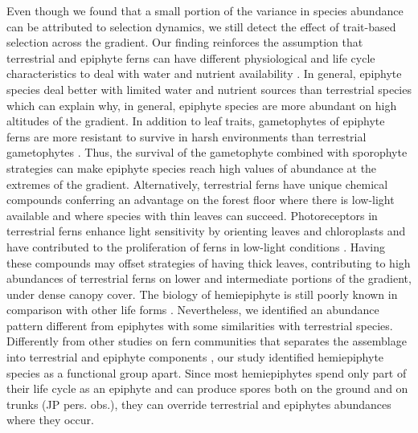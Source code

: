 \documentclass[12pt]{article}
\begin{document}
Even though we found that a small portion of the variance in species abundance can be attributed to selection dynamics, we still detect the effect of trait-based selection across the gradient.  
Our finding reinforces the assumption that terrestrial and epiphyte ferns can have different physiological and life cycle characteristics to deal with water and nutrient availability \citep{Page2002, Watkins2012}. In general, epiphyte species deal better with limited water and nutrient sources than terrestrial species \citep{Page2002, Schuettpelz2009, Watkins2012} which can explain why, in general, epiphyte species are more  abundant on high altitudes of the gradient. In addition to leaf traits, gametophytes of epiphyte ferns are more resistant to survive in harsh environments than terrestrial gametophytes \citep{Watkins2012}. Thus, the survival of the gametophyte combined with sporophyte strategies can make epiphyte species reach high values of abundance at the extremes of the gradient. Alternatively, terrestrial ferns have unique chemical compounds conferring an advantage on the forest floor where there is low-light available \citep{Kawai2003} and where species with thin leaves can succeed. Photoreceptors in terrestrial ferns enhance light sensitivity by orienting leaves and chloroplasts and have contributed to the proliferation of ferns in low-light conditions \citep{Kawai2003}. Having these compounds may offset strategies of having thick leaves, contributing to high abundances of terrestrial ferns on lower and intermediate portions of the gradient, under dense canopy
cover. The biology of hemiepiphyte is still poorly known in comparison with other life forms \citep{Watkins2012}. Nevertheless, we identified an abundance pattern different from epiphytes with some similarities with terrestrial species. Differently from other studies on fern communities that separates the assemblage into terrestrial and epiphyte components \citep{WatkinsJr2006, Kluge2010}, our study identified hemiepiphyte species as a functional group apart. Since most hemiepiphytes spend only part of their life cycle as an epiphyte and can produce spores both on the ground and on trunks (JP pers. obs.), they can override terrestrial and epiphytes abundances where they occur. 
\end{document}
